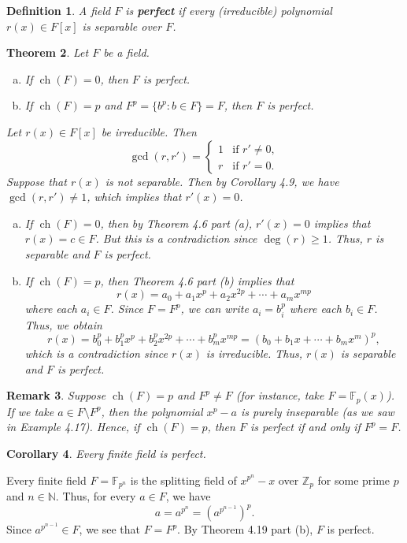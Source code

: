 \documentclass[10pt]{article}
\makeatletter
\newcommand{\N}{\mathbb{N}}
\newcommand{\Z}{\mathbb{Z}}
\newcommand{\F}{\mathbb{F}}
\DeclareMathOperator{\ch}{ch}
\theoremstyle{newstyle}
\newtheorem{thm}{Theorem}[section]
\newtheorem{cor}[thm]{Corollary}
\newtheorem{remark}[thm]{Remark}
\newtheorem{defn}[thm]{Definition}
\newenvironment{pf}[1][\proofname]{\par
  \pushQED{\qed}%
  \normalfont \topsep0\p@\relax
  \trivlist
  \item[\hskip\labelsep\scshape
  #1\@addpunct{.}]\ignorespaces
}{%
  \popQED\endtrivlist\@endpefalse
}
\makeatother
\begin{document}
\begin{defn}
A field $F$ is {\bf perfect} if every (irreducible) polynomial $r(x) \in F[x]$ 
is separable over $F$. 
\end{defn}

\begin{thm}
Let $F$ be a field.
\begin{enumerate}[(a)]
    \item If $\ch(F) = 0$, then $F$ is perfect. 
    \item If $\ch(F) = p$ and $F^p = \{b^p : b \in F\} = F$, then $F$ is perfect. 
\end{enumerate}
\begin{pf}
Let $r(x) \in F[x]$ be irreducible. Then 
\[ \gcd(r, r') = \begin{cases} 1 & \text{if } r' \neq 0, \\ r & \text{if } r' = 0. \end{cases} \]
Suppose that $r(x)$ is not separable. Then by Corollary 4.9, we have $\gcd(r, r') \neq 1$, 
which implies that $r'(x) = 0$. 
\begin{enumerate}[(a)]
    \item If $\ch(F) = 0$, then by Theorem 4.6 part (a), $r'(x) = 0$ implies that 
    $r(x) = c \in F$. But this is a contradiction since $\deg(r) \geq 1$. Thus, 
    $r$ is separable and $F$ is perfect. 
    \item If $\ch(F) = p$, then Theorem 4.6 part (b) implies that 
    \[ r(x) = a_0 + a_1x^p + a_2x^{2p} + \cdots + a_m x^{mp} \]
    where each $a_i \in F$. Since $F = F^p$, we can write $a_i = b_i^p$ where each 
    $b_i \in F$. Thus, we obtain 
    \[ r(x) = b_0^p + b_1^p x^p + b_2^p x^{2p} + \cdots + b_m^p x^{mp} = 
    (b_0 + b_1x + \cdots + b_mx^m)^p, \]
    which is a contradiction since $r(x)$ is irreducible. Thus, $r(x)$ is 
    separable and $F$ is perfect. \qedhere 
\end{enumerate}
\end{pf}
\end{thm}

\begin{remark}
Suppose $\ch(F) = p$ and $F^p \neq F$ (for instance, take $F = \F_p(x)$). If we take 
$a \in F \setminus F^p$, then the polynomial $x^p - a$ is purely inseparable 
(as we saw in Example 4.17). Hence, if $\ch(F) = p$, then $F$ is perfect if and only if $F^p = F$. 
\end{remark}

\begin{cor}
Every finite field is perfect.
\end{cor}
\begin{pf}
Every finite field $F = \F_{p^n}$ is the splitting field of $x^{p^n} - x$ over $\Z_p$ for some 
prime $p$ and $n \in \N$. Thus, for every $a \in F$, we have 
\[ a = a^{p^n} = (a^{p^{n-1}})^p. \]
Since $a^{p^{n-1}} \in F$, we see that $F = F^p$. By Theorem 4.19 part (b), $F$ is perfect. 
\end{pf}
\end{document}
